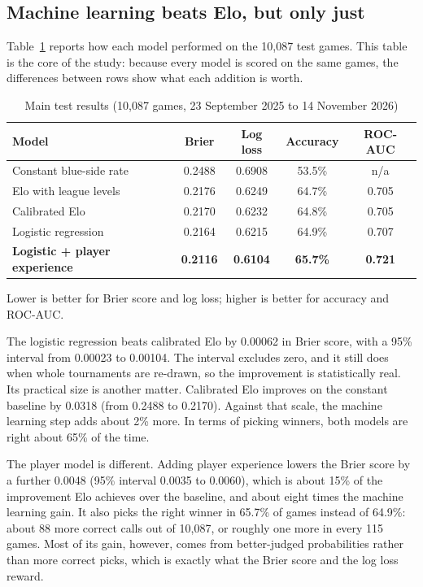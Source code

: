 \documentclass[12pt,a4paper]{article}
\begin{document}
\subsection{Machine learning beats Elo, but only just}

Table~\ref{tab:main} reports how each model performed on the 10,087 test games. This table is the core of the study: because every model is scored on the same games, the differences between rows show what each addition is worth.

\begin{table}[H]
\centering\small
\begin{threeparttable}
\caption{Main test results (10,087 games, 23 September 2025 to 14 November 2026)}\label{tab:main}
\begin{tabular}{@{}lcccc@{}}
\toprule
Model & Brier & Log loss & Accuracy & ROC-AUC \\
\midrule
Constant blue-side rate & 0.2488 & 0.6908 & 53.5\% & n/a \\
Elo with league levels & 0.2176 & 0.6249 & 64.7\% & 0.705 \\
Calibrated Elo & 0.2170 & 0.6232 & 64.8\% & 0.705 \\
Logistic regression & 0.2164 & 0.6215 & 64.9\% & 0.707 \\
\textbf{Logistic + player experience} & \textbf{0.2116} & \textbf{0.6104} & \textbf{65.7\%} & \textbf{0.721} \\
\bottomrule
\end{tabular}
\begin{tablenotes}\footnotesize
\item Lower is better for Brier score and log loss; higher is better for accuracy and ROC-AUC.
\end{tablenotes}
\end{threeparttable}
\end{table}

The logistic regression beats calibrated Elo by 0.00062 in Brier score, with a 95\% interval from 0.00023 to 0.00104. The interval excludes zero, and it still does when whole tournaments are re-drawn, so the improvement is statistically real. Its practical size is another matter. Calibrated Elo improves on the constant baseline by 0.0318 (from 0.2488 to 0.2170). Against that scale, the machine learning step adds about 2\% more. In terms of picking winners, both models are right about 65\% of the time.

The player model is different. Adding player experience lowers the Brier score by a further 0.0048 (95\% interval 0.0035 to 0.0060), which is about 15\% of the improvement Elo achieves over the baseline, and about eight times the machine learning gain. It also picks the right winner in 65.7\% of games instead of 64.9\%: about 88 more correct calls out of 10,087, or roughly one more in every 115 games. Most of its gain, however, comes from better-judged probabilities rather than more correct picks, which is exactly what the Brier score and the log loss reward.
\end{document}
